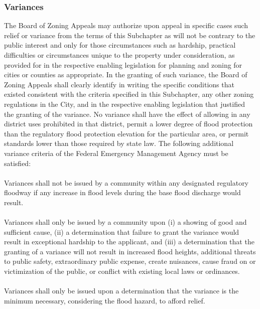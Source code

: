 \subsubsection{Variances}
The Board of Zoning Appeals may authorize upon appeal in specific cases such relief or variance from the terms of this Subchapter as will not be contrary to the public interest and only for those circumstances such as hardship, practical difficulties or circumstances unique to the property under consideration, as provided for in the respective enabling legislation for planning and zoning for cities or counties as appropriate. In the granting of such variance, the Board of Zoning Appeals shall clearly identify in writing the specific conditions that existed consistent with the criteria specified in this Subchapter, any other zoning regulations in the City, and in the respective enabling legislation that justified the granting of the variance. No variance shall have the effect of allowing in any district uses prohibited in that district, permit a lower degree of flood protection than the regulatory flood protection elevation for the particular area, or permit standards lower than those required by state law. The following additional variance criteria of the Federal Emergency Management Agency must be satisfied:
\paragraph{}
Variances shall not be issued by a community within any designated regulatory floodway if any increase in flood levels during the base flood discharge would result.
\paragraph{}
Variances shall only be issued by a community upon (i) a showing of good and sufficient cause, (ii) a determination that failure to grant the variance would result in exceptional hardship to the applicant, and (iii) a determination that the granting of a variance will not result in increased flood heights, additional threats to public safety, extraordinary public expense, create nuisances, cause fraud on or victimization of the public, or conflict with existing local laws or ordinances.
\paragraph{}
Variances shall only be issued upon a determination that the variance is the minimum necessary, considering the flood hazard, to afford relief.
